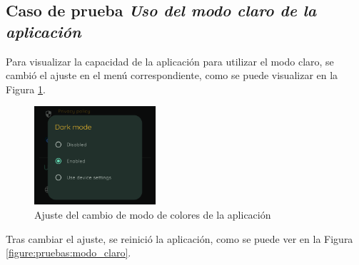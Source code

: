         \subsection*{Caso de prueba \textit{Uso del modo claro de la aplicación}}
        
            Para visualizar la capacidad de la aplicación para utilizar el modo claro, se cambió el ajuste en el menú correspondiente, como se puede visualizar en la Figura \ref{figure:pruebas:modo_claro:ajuste}. 
            \begin{figure}[h]
                \centering
                \includegraphics[width=0.4\textwidth]{figures/pruebas/modo_claro/Ajustes.png}
                \caption{Ajuste del cambio de modo de colores de la aplicación}
                \label{figure:pruebas:modo_claro:ajuste}
            \end{figure}

            Tras cambiar el ajuste, se reinició la aplicación, como se puede ver en la Figura  \ref{figure:pruebas:modo_claro}.
            
